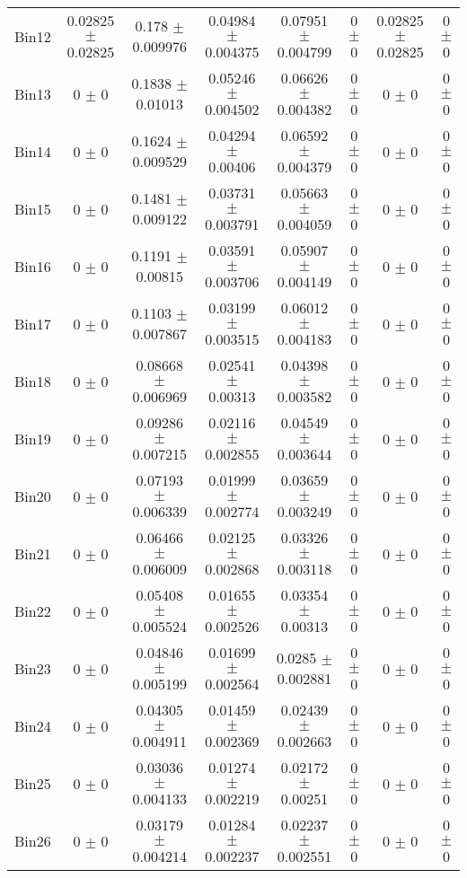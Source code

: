 \begin{tabular}{@{\extracolsep{4pt}}lccccccc@{}}
     Bin12 & 0.02825 $\pm$ 0.02825 & 0.178 $\pm$ 0.009976 & 0.04984 $\pm$ 0.004375 & 0.07951 $\pm$ 0.004799 & 0 $\pm$ 0 & 0.02825 $\pm$ 0.02825 & 0 $\pm$ 0 \\ 
     Bin13 & 0 $\pm$ 0 & 0.1838 $\pm$ 0.01013 & 0.05246 $\pm$ 0.004502 & 0.06626 $\pm$ 0.004382 & 0 $\pm$ 0 & 0 $\pm$ 0 & 0 $\pm$ 0 \\ 
     Bin14 & 0 $\pm$ 0 & 0.1624 $\pm$ 0.009529 & 0.04294 $\pm$ 0.00406 & 0.06592 $\pm$ 0.004379 & 0 $\pm$ 0 & 0 $\pm$ 0 & 0 $\pm$ 0 \\ 
     Bin15 & 0 $\pm$ 0 & 0.1481 $\pm$ 0.009122 & 0.03731 $\pm$ 0.003791 & 0.05663 $\pm$ 0.004059 & 0 $\pm$ 0 & 0 $\pm$ 0 & 0 $\pm$ 0 \\ 
     Bin16 & 0 $\pm$ 0 & 0.1191 $\pm$ 0.00815 & 0.03591 $\pm$ 0.003706 & 0.05907 $\pm$ 0.004149 & 0 $\pm$ 0 & 0 $\pm$ 0 & 0 $\pm$ 0 \\ 
     Bin17 & 0 $\pm$ 0 & 0.1103 $\pm$ 0.007867 & 0.03199 $\pm$ 0.003515 & 0.06012 $\pm$ 0.004183 & 0 $\pm$ 0 & 0 $\pm$ 0 & 0 $\pm$ 0 \\ 
     Bin18 & 0 $\pm$ 0 & 0.08668 $\pm$ 0.006969 & 0.02541 $\pm$ 0.00313 & 0.04398 $\pm$ 0.003582 & 0 $\pm$ 0 & 0 $\pm$ 0 & 0 $\pm$ 0 \\ 
     Bin19 & 0 $\pm$ 0 & 0.09286 $\pm$ 0.007215 & 0.02116 $\pm$ 0.002855 & 0.04549 $\pm$ 0.003644 & 0 $\pm$ 0 & 0 $\pm$ 0 & 0 $\pm$ 0 \\ 
     Bin20 & 0 $\pm$ 0 & 0.07193 $\pm$ 0.006339 & 0.01999 $\pm$ 0.002774 & 0.03659 $\pm$ 0.003249 & 0 $\pm$ 0 & 0 $\pm$ 0 & 0 $\pm$ 0 \\ 
     Bin21 & 0 $\pm$ 0 & 0.06466 $\pm$ 0.006009 & 0.02125 $\pm$ 0.002868 & 0.03326 $\pm$ 0.003118 & 0 $\pm$ 0 & 0 $\pm$ 0 & 0 $\pm$ 0 \\ 
     Bin22 & 0 $\pm$ 0 & 0.05408 $\pm$ 0.005524 & 0.01655 $\pm$ 0.002526 & 0.03354 $\pm$ 0.00313 & 0 $\pm$ 0 & 0 $\pm$ 0 & 0 $\pm$ 0 \\ 
     Bin23 & 0 $\pm$ 0 & 0.04846 $\pm$ 0.005199 & 0.01699 $\pm$ 0.002564 & 0.0285 $\pm$ 0.002881 & 0 $\pm$ 0 & 0 $\pm$ 0 & 0 $\pm$ 0 \\ 
     Bin24 & 0 $\pm$ 0 & 0.04305 $\pm$ 0.004911 & 0.01459 $\pm$ 0.002369 & 0.02439 $\pm$ 0.002663 & 0 $\pm$ 0 & 0 $\pm$ 0 & 0 $\pm$ 0 \\ 
     Bin25 & 0 $\pm$ 0 & 0.03036 $\pm$ 0.004133 & 0.01274 $\pm$ 0.002219 & 0.02172 $\pm$ 0.00251 & 0 $\pm$ 0 & 0 $\pm$ 0 & 0 $\pm$ 0 \\ 
     Bin26 & 0 $\pm$ 0 & 0.03179 $\pm$ 0.004214 & 0.01284 $\pm$ 0.002237 & 0.02237 $\pm$ 0.002551 & 0 $\pm$ 0 & 0 $\pm$ 0 & 0 $\pm$ 0 \\ 

\end{tabular}
